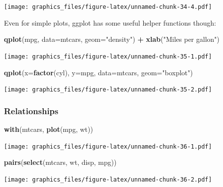 \documentclass[]{article}
\newenvironment{Shaded}{\begin{snugshade}}{\end{snugshade}}
\newcommand{\DataTypeTok}[1]{\textcolor[rgb]{0.13,0.29,0.53}{#1}}
\newcommand{\KeywordTok}[1]{\textcolor[rgb]{0.13,0.29,0.53}{\textbf{#1}}}
\newcommand{\NormalTok}[1]{#1}
\newcommand{\OperatorTok}[1]{\textcolor[rgb]{0.81,0.36,0.00}{\textbf{#1}}}
\newcommand{\StringTok}[1]{\textcolor[rgb]{0.31,0.60,0.02}{#1}}
\begin{document}
\texttt{[image: graphics\_files/figure-latex/unnamed-chunk-34-4.pdf]}

Even for simple plots, ggplot has some useful helper functions though:

\begin{Shaded}
\begin{Highlighting}[]
\KeywordTok{qplot}\NormalTok{(mpg, }\DataTypeTok{data=}\NormalTok{mtcars, }\DataTypeTok{geom=}\StringTok{"density"}\NormalTok{) }\OperatorTok{+}\StringTok{ }\KeywordTok{xlab}\NormalTok{(}\StringTok{"Miles per gallon"}\NormalTok{)}
\end{Highlighting}
\end{Shaded}

\texttt{[image: graphics\_files/figure-latex/unnamed-chunk-35-1.pdf]}

\begin{Shaded}
\begin{Highlighting}[]
\KeywordTok{qplot}\NormalTok{(}\DataTypeTok{x=}\KeywordTok{factor}\NormalTok{(cyl), }\DataTypeTok{y=}\NormalTok{mpg, }\DataTypeTok{data=}\NormalTok{mtcars, }\DataTypeTok{geom=}\StringTok{"boxplot"}\NormalTok{)}
\end{Highlighting}
\end{Shaded}

\texttt{[image: graphics\_files/figure-latex/unnamed-chunk-35-2.pdf]}

\hypertarget{relationships-1}{%
\subsubsection{Relationships}\label{relationships-1}}

\begin{Shaded}
\begin{Highlighting}[]
\KeywordTok{with}\NormalTok{(mtcars, }\KeywordTok{plot}\NormalTok{(mpg, wt))}
\end{Highlighting}
\end{Shaded}

\texttt{[image: graphics\_files/figure-latex/unnamed-chunk-36-1.pdf]}

\begin{Shaded}
\begin{Highlighting}[]
\KeywordTok{pairs}\NormalTok{(}\KeywordTok{select}\NormalTok{(mtcars, wt, disp, mpg))}
\end{Highlighting}
\end{Shaded}

\texttt{[image: graphics\_files/figure-latex/unnamed-chunk-36-2.pdf]}
\end{document}
